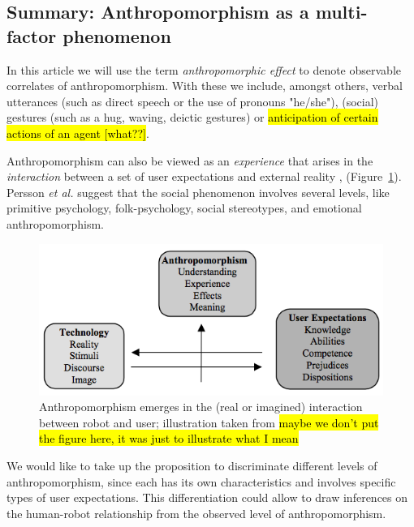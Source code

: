 \documentclass{frontiersSCNS} %
\begin{document}
\subsection{Summary: Anthropomorphism as a multi-factor phenomenon}
\label{sec:multi-factors}

In this article we will use the term \emph{anthropomorphic effect} to denote
observable correlates of anthropomorphism. With these we include, amongst
others, verbal utterances (such as direct speech or the use of pronouns
"he/she"), (social) gestures (such as a hug, waving, deictic gestures) or
\hl{anticipation of certain actions of an agent [what??]}.

Anthropomorphism can also be viewed as an \textit{experience} that arises in the
\textit{interaction} between a set of user expectations and external reality
\cite{persson_anthropomorphism_2000},
(Figure~\ref{fig:anthropomorphism_and_interaction}). Persson \textit{et al.}
suggest that the social phenomenon involves several levels, like primitive
psychology, folk-psychology, social stereotypes, and emotional anthropomorphism. 

\begin{figure}[ht!]\centering
  \includegraphics[scale=0.42]{persson_anthropomorphism.png}
 \caption{Anthropomorphism emerges in the (real or imagined) interaction between
 robot and user; illustration taken from \cite{persson_anthropomorphism_2000}
 \hl{maybe we don't put the figure here, it was just to illustrate what I mean}}

 \label{fig:anthropomorphism_and_interaction}       %
 \end{figure}

We would like to take up the proposition to discriminate different levels of
anthropomorphism, since each has its own characteristics and involves specific
types of user expectations. This differentiation could allow to draw inferences
on the human-robot relationship from the observed level of anthropomorphism.
\end{document}
